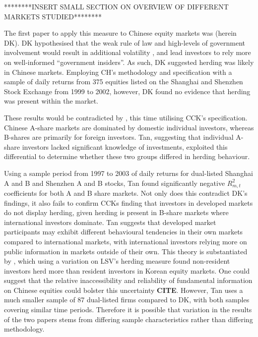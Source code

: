 \documentclass[12pt]{article}
\numberwithin{table}{section}   %
\begin{document}
********INSERT SMALL SECTION ON OVERVIEW OF DIFFERENT MARKETS STUDIED********

The first paper to apply this measure to Chinese equity markets was \citet{dk} (herein DK). DK hypothesised that the weak rule of law and high-levels of government involvement would result in additional volatility \citep{su}, and lead investors to rely more on well-informed “government insiders”. As such, DK suggested herding was likely in Chinese markets. Employing CH’s methodology and specification with a sample of daily returns from 375 equities listed on the Shanghai and Shenzhen Stock Exchange from 1999 to 2002, however, DK found no evidence that herding was present within the market.

These results would be contradicted by \citet{tan}, this time utilising CCK’s specification. Chinese A-share markets are dominated by domestic individual investors, whereas B-shares are primarily for foreign investors. Tan, suggesting that individual A-share investors lacked significant knowledge of investments, exploited this differential to determine whether these two groups differed in herding behaviour.

Using a sample period from 1997 to 2003 of daily returns for dual-listed Shanghai A and B and Shenzhen A and B stocks, Tan found significantly negative $R_{m,t}^2$ coefficients for both A and B share markets. Not only does this contradict DK’s findings, it also fails to confirm CCKs finding that investors in developed markets do not display herding, given herding is present in B-share markets where international investors dominate. Tan suggests that developed market participants may exhibit different behavioural tendencies in their own markets compared to international markets, with international investors relying more on public information in markets outside of their own. This theory is substantiated by \citet{kim}, which using a variation on LSV’s herding measure found non-resident investors herd more than resident investors in Korean equity markets. One could suggest that the relative inaccessibility and reliability of fundamental information on Chinese equities could bolster this uncertainty \textbf{CITE}. However, Tan uses a much smaller sample of 87 dual-listed firms compared to DK, with both samples covering similar time periods. Therefore it is possible that variation in the results of the two papers stems from differing sample characteristics rather than differing methodology.
\end{document}
